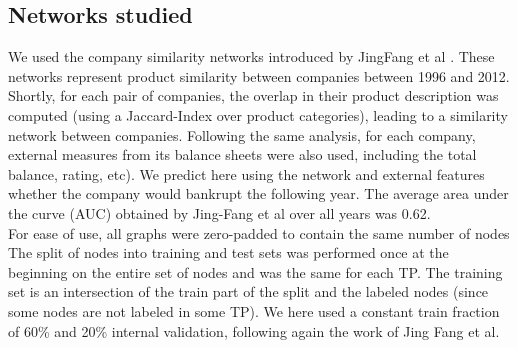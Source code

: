 \subsection{Networks studied}
We used the company similarity networks introduced by JingFang et al \cite{fan2018combined}. These networks represent product similarity between companies between 1996 and 2012. Shortly, for each pair of companies, the overlap in their product description was computed (using a Jaccard-Index over product categories), leading to a similarity network between companies. Following the same analysis, for each company, external measures from its balance sheets were also used, including the total balance, rating, etc). We predict here using the network and external features whether the company would bankrupt the following year. The average area under the curve (AUC) obtained by Jing-Fang et al over all years was 0.62.
\\For ease of use, all graphs were zero-padded to contain the same number of nodes The split of nodes into training and test sets was performed once at the beginning on the entire set of nodes and was the same for each TP. The training set is an intersection of the train part of the split and the labeled nodes (since some nodes are not labeled in some TP). We here used a constant train fraction of 60\% and 20\% internal validation, following again the work of Jing Fang et al.
